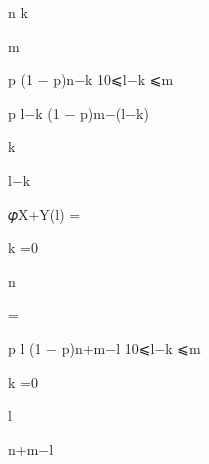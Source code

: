 \documentclass[a4paper,portrait,12pt]{article}
\begin{document}
\begin{flushleft}
n k
\end{flushleft}


\begin{flushleft}
m
\end{flushleft}


\begin{flushleft}
p (1 $-$ p)n$-$k 10⩽l$-$k ⩽m
\end{flushleft}


\begin{flushleft}
p l$-$k (1 $-$ p)m$-$(l$-$k)
\end{flushleft}


\begin{flushleft}
k
\end{flushleft}


\begin{flushleft}
l$-$k
\end{flushleft}





\begin{flushleft}
𝜑X+Y(l) =
\end{flushleft}


\begin{flushleft}
k =0
\end{flushleft}


\begin{flushleft}
n
\end{flushleft}





=





\begin{flushleft}
p l (1 $-$ p)n+m$-$l 10⩽l$-$k ⩽m
\end{flushleft}





\begin{flushleft}
k =0
\end{flushleft}


\begin{flushleft}
l
\end{flushleft}





\begin{flushleft}
n+m$-$l
\end{flushleft}
\end{document}

